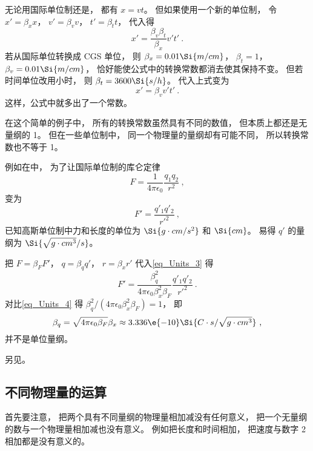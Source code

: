 \begin{example}{}
无论用国际单位制还是， 都有 $x = vt$。 但如果使用一个新的单位制， 令 $x' = \beta_x x$， $v' = \beta_v v$， $t' = \beta_t t$， 代入得
\begin{equation}
x' = \frac{\beta_v\beta_t}{\beta_x} v' t'~.
\end{equation}
若从国际单位转换成 CGS 单位， 则 $\beta_x = 0.01 \Si{m/cm}$， $\beta_t = 1$， $\beta_v = 0.01 \Si{m/cm}$， 恰好能使公式中的转换常数都消去使其保持不变。 但若时间单位改用小时， 则 $\beta_t = 3600 \Si{s/h}$。 代入上式变为
\begin{equation}
x' = \beta_v v' t'~.
\end{equation}
这样，公式中就多出了一个常数。
\end{example}
在这个简单的例子中， 所有的转换常数虽然具有不同的数值， 但本质上都还是无量纲的 1。 但在一些单位制中， 同一个物理量的量纲却有可能不同， 所以转换常数也不等于 1。
\begin{example}{}
例如在中， 为了让国际单位制的库仑定律
\begin{equation}\label{eq_Units_3}
F = \frac{1}{4\pi\epsilon_0}\frac{q_1 q_2}{r^2}~,
\end{equation}
变为
\begin{equation}\label{eq_Units_4}
F' = \frac{q'_1 q'_2}{r'^2}~,
\end{equation}
已知高斯单位制中力和长度的单位为 $\Si{g\cdot cm/s^2}$ 和 $\Si{cm}$。 易得 $q'$ 的量纲为 $\Si{\sqrt{g\cdot cm^3}/s}$。

把 $F = \beta_F F'$， $q = \beta_q q'$， $r = \beta_x r'$ 代入\autoref{eq_Units_3} 得
\begin{equation}
F' =  \frac{\beta_q^2}{4\pi\epsilon_0\beta_x^2 \beta_F}\frac{q'_1 q'_2}{r'^2}~.
\end{equation}
对比\autoref{eq_Units_4} 得 $\beta_q^2/(4\pi\epsilon_0\beta_x^2 \beta_F) = 1$， 即
\begin{equation}
\beta_q = \sqrt{4\pi\epsilon_0 \beta_F} \beta_x \approx 3.336\e{-10} \Si{C\cdot s/\sqrt{g\cdot cm^3}}~,
\end{equation}
并不是单位量纲。
\end{example}

另见。

\subsection{不同物理量的运算}
首先要注意， 把两个具有不同量纲的物理量相加减没有任何意义， 把一个无量纲的数与一个物理量相加减也没有意义。 例如把长度和时间相加， 把速度与数字 2 相加都是没有意义的。


